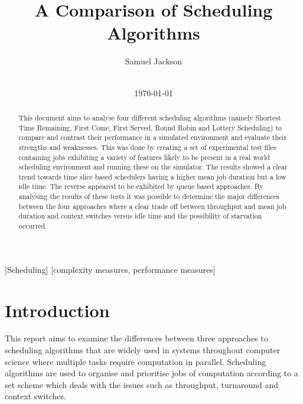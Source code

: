 \documentclass{acm_proc_article-sp}
\begin{document}
\title{A Comparison of Scheduling Algorithms}
\author{
\alignauthor
Samuel Jackson\\
       \\
}
\date{\today}

\maketitle
\begin{abstract}
This document aims to analyse four different scheduling algorithms (namely Shortest Time Remaining, First Come, First Served, Round Robin and Lottery Scheduling) to compare and contrast their performance in a simulated environment and evaluate their strengths and weaknesses. This was done by creating a set of experimental test files containing jobs exhibiting a variety of features likely to be present in a real world scheduling environment and running these on the simulator. The results showed a clear trend towards time slice based schedulers having a higher mean job duration but a low idle time. The reverse appeared to be exhibited by queue based approaches. By analysing the results of these tests it was possible to determine the major differences between the four approaches where a clear trade off between throughput and mean job duration and context switches versus idle time and the possibility of starvation occurred.

\end{abstract}

[Scheduling]
[complexity measures, performance measures]



\section{Introduction}
This report aims to examine the differences between three approaches to scheduling algorithms that are widely used in systems throughout computer science where multiple tasks require computation in parallel. Scheduling algorithms are used to organise and prioritise jobs of computation according to a set scheme which deals with the issues such as throughput, turnaround and context switches.
\end{document}
